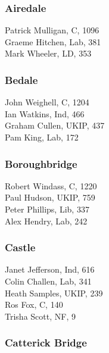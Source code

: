 \documentclass[a4paper,openany,10pt]{book}
\begin{document}
\subsubsection*{Airedale}



Patrick Mulligan, C, 1096\\
Graeme Hitchen, Lab, 381\\
Mark Wheeler, LD, 353\\


\subsubsection*{Bedale}



John Weighell, C, 1204\\
Ian Watkins, Ind, 466\\
Graham Cullen, UKIP, 437\\
Pam King, Lab, 172\\


\subsubsection*{Boroughbridge}



Robert Windass, C, 1220\\
Paul Hudson, UKIP, 759\\
Peter Phillips, Lib, 337\\
Alex Hendry, Lab, 242\\


\subsubsection*{Castle}



Janet Jefferson, Ind, 616\\
Colin Challen, Lab, 341\\
Heath Samples, UKIP, 239\\
Ros Fox, C, 140\\
Trisha Scott, NF, 9\\


\subsubsection*{Catterick Bridge}
\end{document}
